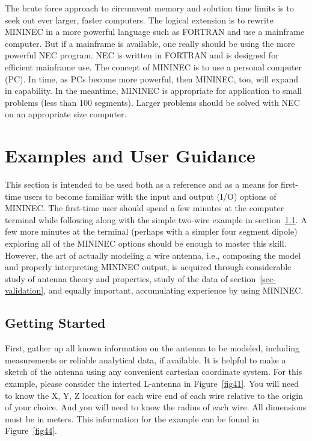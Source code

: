 \documentclass[12pt]{article}
\begin{document}
The brute force approach to circumvent memory and solution time limits
is to seek out ever larger, faster computers. The logical extension is
to rewrite MININEC in a more powerful language such as FORTRAN and use a
mainframe computer. But if a mainframe is available, one really should
be using the more powerful NEC program. NEC is written in FORTRAN and is
designed for efficient mainframe use. The concept of MININEC is to use a
personal computer (PC). In time, as PCs become more powerful, then
MININEC, too, will expand in capability. In the meantime, MININEC is
appropriate for application to small problems (less than 100 segments).
Larger problems should be solved with NEC on an appropriate size
computer.

\section{Examples and User Guidance}
This section is intended to be used both as a reference and as a means
for first-time users to become familiar with the input and output (I/O)
options of MININEC. The first-time user should spend a few minutes at
the computer terminal while following along with the simple two-wire
example in section~\ref{sec-getting-started}. A few more minutes at the
terminal (perhaps with a simpler four segment dipole) exploring all of
the MININEC options should be enough to master this skill. However, the
art of actually modeling a wire antenna, i.e., composing the model and
properly interpreting MININEC output, is acquired through considerable
study of antenna theory and properties, study of the data of
section~\ref{sec-validation}, and equally important, accumulating
experience by using MININEC.

\subsection{Getting Started}
\label{sec-getting-started}
First, gather up all known information on the antenna to be modeled,
including measurements or reliable analytical data, if available. It is
helpful to make a sketch of the antenna using any convenient cartesian
coordinate system. For this example, please consider the interted
L-antenna in Figure~\ref{fig41}. You will need to know the X, Y, Z
location for each wire end of each wire relative to the origin of your
choice. And you will need to know the radius of each wire. All
dimensions must be in meters. This information for the example can be
found in Figure~\ref{fig44}.
\end{document}
